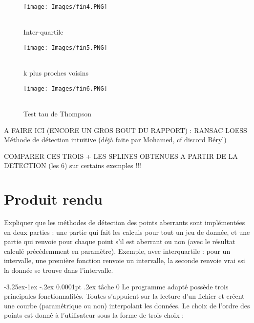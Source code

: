 \documentclass[a4paper,12pt]{article} %
\makeatletter
\renewcommand\paragraph{\@startsection{paragraph}{4}{\z@}%
                                      {-3.25ex\@plus -1ex \@minus -.2ex}%
                                      {0.0001pt \@plus .2ex}%
                                      {\normalfont\normalsize\bfseries}}
\makeatother
\begin{document}
        \begin{figure}[H] %
        \texttt{[image: Images/fin4.PNG]} %
        \caption{\\Inter-quartile} %
        \label{m15} %
        \endminipage
        \hfill
        \endminipage
        \texttt{[image: Images/fin5.PNG]}  
        \caption{\\k plus proches voisins}
        \label{m5}
        \endminipage
        \hfill
        \endminipage
        \texttt{[image: Images/fin6.PNG]}  
        \caption{\\Test tau de Thompson}
        \label{m35}
        \endminipage
        \end{figure}
        
        A FAIRE ICI (ENCORE UN GROS BOUT DU RAPPORT) :
        RANSAC
        LOESS
        Méthode de détection intuitive (déjà faite par Mohamed, cf discord Béryl)
        
        COMPARER CES TROIS + LES SPLINES OBTENUES A PARTIR DE LA DETECTION (les 6) sur certains exemples !!!

\renewcommand\partname{}
\part{Produit rendu}

Expliquer que les méthodes de détection des points aberrants sont implémentées en deux parties : une partie qui fait les calculs pour tout un jeu de donnée, et une partie qui renvoie pour chaque point s'il est aberrant ou non (avec le résultat calculé précédemment en paramètre). Exemple, avec interquartile : pour un intervalle, une première fonction renvoie un intervalle, la seconde renvoie vrai ssi la donnée se trouve dans l'intervalle. 

\paragraph{tâche 0}
Le programme adapté possède trois principales fonctionnalités. Toutes s'appuient sur la lecture d'un fichier et créent une courbe (paramétrique ou non) interpolant les données.
Le choix de l'ordre des points est donné à l'utilisateur sous la forme de trois choix : 
\end{document}
